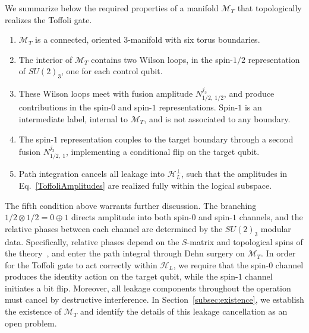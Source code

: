 \documentclass[12pt,a4paper]{article}
\begin{document}
We summarize below the required properties of a manifold $\mathcal{M}_T$ that topologically realizes the Toffoli gate.
%
\begin{enumerate}
\item $\mathcal{M}_T$ is a connected, oriented $3$-manifold with six torus boundaries.
\item The interior of $\mathcal{M}_T$ contains two Wilson loops, in the spin-$1/2$ representation of $SU(2)_3$, one for each control qubit.
\item These Wilson loops meet with fusion amplitude $N^{j_3}_{1/2,\ 1/2}$, and produce contributions in the spin-$0$ and spin-$1$ representations. Spin-$1$ is an intermediate label, internal to $\mathcal{M}_T$, and is not associated to any boundary.
\item The spin-$1$ representation couples to the target boundary through a second fusion  $N^{j_3}_{1/2,\ 1}$, implementing a conditional flip on the target qubit.
\item Path integration cancels all leakage into $\mathcal{H}_L^\perp$, such that the amplitudes in Eq.\ \eqref{ToffoliAmplitudes} are realized fully within the logical subspace.
\end{enumerate}
%
The fifth condition above warrants further discussion. The branching $1/2 \otimes 1/2 = 0 \oplus 1$ directs amplitude into both spin-$0$ and spin-$1$ channels, and the relative phases between each channel are determined by the $SU(2)_3$ modular data. Specifically, relative phases depend on the $S$-matrix and topological spins of the theory~\cite{Witten1989}, and enter the path integral through Dehn surgery on $\mathcal{M}_T$. In order for the Toffoli gate to act correctly within $\mathcal{H}_L$, we require that the spin-$0$ channel produces the identity action on the target qubit, while the spin-$1$ channel initiates a bit flip. Moreover, all leakage components throughout the operation must cancel by destructive interference. In Section~\ref{subsec:existence}, we establish the existence of $\mathcal{M}_T$ and identify the details of this leakage cancellation as an open problem.
\end{document}
